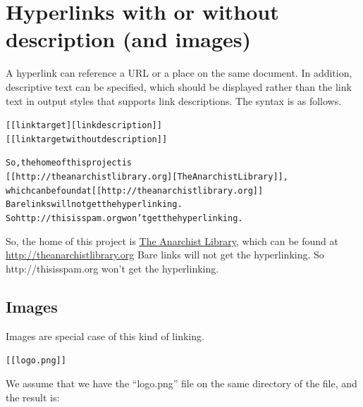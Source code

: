 \documentclass[DIV=12,%
               BCOR=0mm,%
               fontsize=10pt,%
               oneside,%
               paper=210mm:11in]{scrbook}
\newcommand*{\Slash}{\slash\hspace{0pt}}
\begin{document}
\chapter{Hyperlinks with or without description (and images)}


A hyperlink can reference a URL or a place on the same document.  In
addition, descriptive text can be specified, which should be displayed
rather than the link text in output styles that supports link
descriptions.  The syntax is as follows.


\begin{alltt}
     [[link target][link description]]
     [[link target without description]]

So, the home of this project is
[[http://theanarchistlibrary.org][The Anarchist Library]],
which can be found at [[http://theanarchistlibrary.org]]
Bare links will not get the hyperlinking.
So http://thisisspam.org won't get the hyperlinking.

\end{alltt}


So, the home of this project is
\href{http://theanarchistlibrary.org}{The Anarchist Library},
which can be found at \url{http://theanarchistlibrary.org}
Bare links will not get the hyperlinking.
So http:\Slash{}\Slash{}thisisspam.org won't get the hyperlinking.

\section{Images}


Images are special case of this kind of linking.


\begin{alltt}
[[logo.png]]

\end{alltt}


We assume that we have the “logo.png” file on the same
directory of the file, and the result is:
\end{document}
